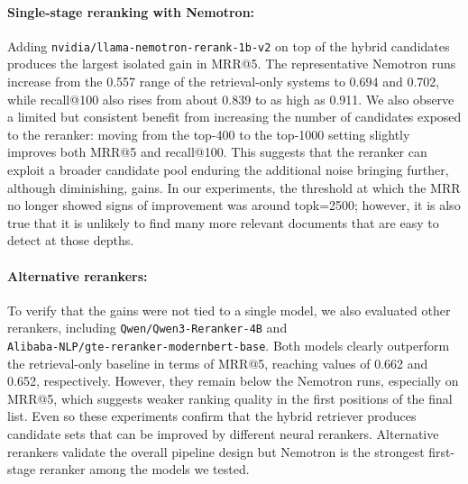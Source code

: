 \paragraph{Single-stage reranking with Nemotron:}
Adding \texttt{nvidia/llama-nemotron-rerank-1b-v2} on top of the hybrid candidates produces the largest isolated gain in MRR@5. The representative Nemotron runs increase from the 0.557 range of the retrieval-only systems to 0.694 and 0.702, while recall@100 also rises from about 0.839 to as high as 0.911. We also observe a limited but consistent benefit from increasing the number of candidates exposed to the reranker: moving from the top-400 to the top-1000 setting slightly improves both MRR@5 and recall@100. This suggests that the reranker can exploit a broader candidate pool enduring the additional noise bringing further, although diminishing, gains. In our experiments, the threshold at which the MRR no longer showed signs of improvement was around topk=2500; however, it is also true that it is unlikely to find many more relevant documents that are easy to detect at those depths.

\paragraph{Alternative rerankers:}
To verify that the gains were not tied to a single model, we also evaluated other rerankers, including \texttt{Qwen/Qwen3-Reranker-4B} and \\\texttt{Alibaba-NLP/gte-reranker-modernbert-base}. Both models clearly outperform the retrieval-only baseline in terms of MRR@5, reaching values of 0.662 and 0.652, respectively. However, they remain below the Nemotron runs, especially on MRR@5, which suggests weaker ranking quality in the first positions of the final list. Even so these experiments confirm that the hybrid retriever produces candidate sets that can be improved by different neural rerankers. Alternative rerankers validate the overall pipeline design but Nemotron is the strongest first-stage reranker among the models we tested.

